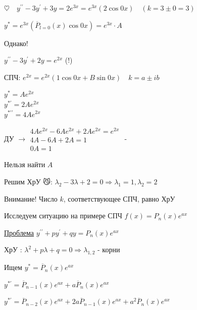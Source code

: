 \documentclass[12pt]{article}
\begin{document}
     $\displaystyle \heartsuit \quad y^{\prime\prime} - 3y^\prime + 3y = 2e^{3x} = e^{3x} (2 \cos 0x) \quad (k = 3 \pm 0 = 3)$

    $\displaystyle y^* = e^{3x} (\overline{P}_{l = 0} (x) \cos 0x) = e^{3x} \cdot A$

     Однако!

    $\displaystyle y^{\prime\prime} - 3y^\prime + 2y = e^{2x}$ (!)

    СПЧ: $\displaystyle e^{2x} = e^{2x} (1 \cos 0x + B \sin 0x) \quad k = a \pm ib$

    \begin{rcases*}
    $\displaystyle y^* = Ae^{2x}$ \\

    $\displaystyle y^{*\prime} = 2Ae^{2x}$ \\

    $\displaystyle y^{*\prime\prime} = 4Ae^{2x}$ \\
    \end{rcases*} ДУ $\displaystyle \longrightarrow \begin{matrix}4Ae^{2x} - 6Ae^{2x} + 2Ae^{2x} = e^{2x} \\ 4A - 6A + 2A = 1 \\ 0A = 1\end{matrix}$ - {\Huge 🤯}

    Нельзя найти $A$

    Решим ХрУ 😼: $\displaystyle \lambda_2 - 3\lambda + 2 = 0 \Longrightarrow \lambda_1 = 1, \lambda_2 = 2$

    Внимание! Число $k$, соответствующее СПЧ, равно ХрУ \Cat

    \vspace{5mm}

    Исследуем ситуацию на примере СПЧ $\displaystyle f(x) = P_n(x) e^{ax}$

    \underline{Проблема} $\displaystyle y^{\prime\prime} + py^\prime + qy = P_n(x)e^{ax}$

    ХрУ \Cat: $\displaystyle \lambda^2 + p\lambda + q = 0 \Longrightarrow \lambda_{1,2}$ - корни

    \vspace{5mm}
    Ищем $\displaystyle y^* = \overline{P}_n(x) e^{ax}$

    $\displaystyle y^{*\prime} = \overline{P}_{n - 1} (x) e^{ax} + a\overline{P}_n(x) e^{ax}$

    $\displaystyle y^{*\prime} = \overline{P}_{n - 2} (x) e^{ax} + 2a\overline{P}_{n - 1} (x) e^{ax} + a^2\overline{P}_n(x) e^{ax}$
\end{document}
